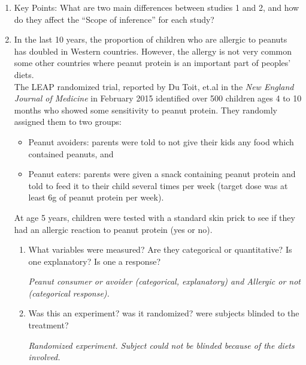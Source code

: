 \begin{enumerate}
\begin{enumerate}
    \end{enumerate}
  \item Key Points:  What are two main differences between studies 1
    and 2, and how do they affect the ``Scope of inference'' for each
    study? \vfill
  \item In the last 10 years, the proportion of children who are
    allergic to peanuts has doubled in Western countries. However,
    the allergy is  not very common some other countries where peanut
    protein is an important part of peoples' diets.   \\
     The LEAP randomized trial, reported by  Du Toit, et.al in the
     {\it  New England Journal of  Medicine} in February 2015
     identified over 500 children ages 4 to 10 months who showed some
     sensitivity to peanut protein. They randomly assigned them to two
     groups:
     \begin{itemize}
     \item Peanut avoiders: parents were told to not give their kids
       any food which contained peanuts, and
     \item Peanut eaters: parents were given a snack containing 
       peanut protein and told to feed it to their child several times
       per week (target dose was at least  6g of peanut protein per week).
     \end{itemize}
      At age 5 years, children were tested with a standard skin prick
      to see if they had an allergic reaction to peanut protein (yes
      or no).
      \begin{enumerate}
      \item What variables were measured? 
      Are they categorical or quantitative? Is one explanatory? Is one
      a response?
\begin{students}
        \vfill
\end{students}
\begin{key}
 {\it Peanut consumer or avoider (categorical, explanatory) and
   Allergic or not (categorical response).}
\end{key}

    \item Was this an experiment? was it randomized? were subjects
      blinded to the treatment?
\begin{students}
        \vspace*{\fill}
\end{students}
\begin{key}
 {\it Randomized experiment. Subject could not be blinded because of
   the diets involved.}
\end{key}

      \end{enumerate}

\end{enumerate}